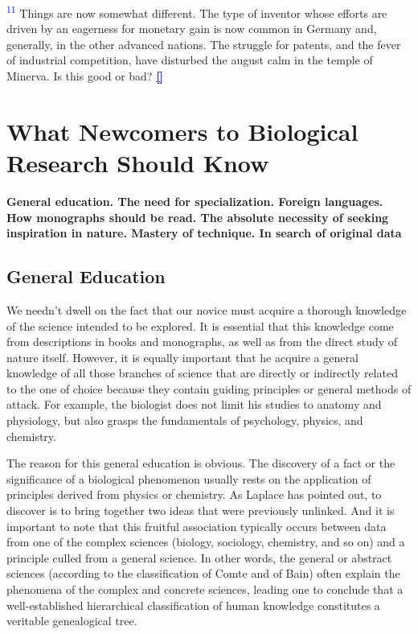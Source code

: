 \documentclass{article}
\newcommand{\boldline}[1]{%
 \vspace{\baselineskip}%
 \noindent\textbf{#1}\\[0.5\baselineskip]%
}
\newcommand{\notetext}[2]{
 \par\noindent
 \hypertarget{note:#1}{\textsuperscript{\textcolor{blue}{#1}}} #2
 \hyperlink{ref:#1}{\textcolor{blue}{\textbf{[\textuparrow]}}}
 \par\vspace{1em}
}
\begin{document}
\notetext{11}{ Things are now somewhat different. The type of inventor whose efforts are driven by an eagerness for monetary gain is now common in Germany and, generally, in the other advanced nations. The struggle for patents, and the fever of industrial competition, have disturbed the august calm in the temple of Minerva. Is this good or bad? }


\newpage \section{What Newcomers to Biological Research Should Know}

\boldline{General education. The need for specialization. Foreign languages. How monographs should be read. The absolute necessity of seeking inspiration in nature. Mastery of technique. In search of original data}

\subsection*{General Education}

We needn’t dwell on the fact that our novice must acquire a thorough knowledge of the science intended to be explored. It is essential that this knowledge come from descriptions in books and monographs, as well as from the direct study of nature itself. However, it is equally important that he acquire a general knowledge of all those branches of science that are directly or indirectly related to the one of choice because they contain guiding principles or general methods of attack. For example, the biologist does not limit his studies to anatomy and physiology, but also grasps the fundamentals of psychology, physics, and chemistry.

The reason for this general education is obvious. The discovery of a fact or the significance of a biological phenomenon usually rests on the application of principles derived from physics or chemistry. As Laplace has pointed out, to discover is to bring together two ideas that were previously unlinked. And it is important to note that this fruitful association typically occurs between data from one of the complex sciences (biology, sociology, chemistry, and so on) and a principle culled from a general science. In other words, the general or abstract sciences (according to the classification of Comte and of Bain) often explain the phenomena of the complex and concrete sciences, leading one to conclude that a well-established hierarchical classification of human knowledge constitutes a veritable genealogical tree.
\end{document}
